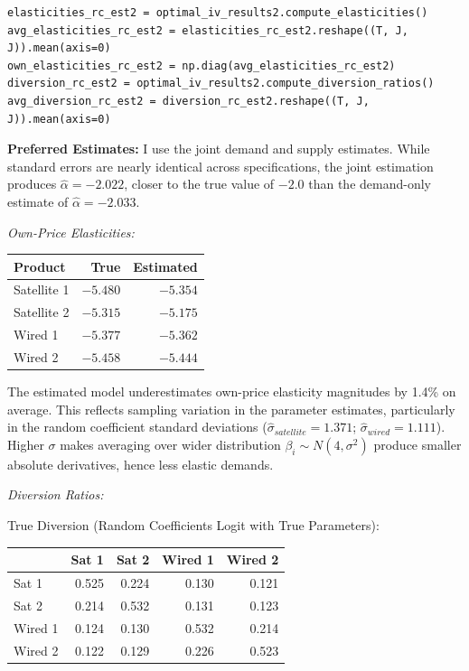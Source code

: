 \documentclass[english,11pt]{article}
\begin{document}
\begin{enumerate}
\begin{verbatim}
elasticities_rc_est2 = optimal_iv_results2.compute_elasticities()
avg_elasticities_rc_est2 = elasticities_rc_est2.reshape((T, J, J)).mean(axis=0)
own_elasticities_rc_est2 = np.diag(avg_elasticities_rc_est2)
diversion_rc_est2 = optimal_iv_results2.compute_diversion_ratios()
avg_diversion_rc_est2 = diversion_rc_est2.reshape((T, J, J)).mean(axis=0)
\end{verbatim}

\textbf{Preferred Estimates:} I use the joint demand and supply estimates. While standard errors are nearly identical across specifications, the joint estimation produces $\hat{\alpha} = -2.022$, closer to the true value of $-2.0$ than the demand-only estimate of $\hat{\alpha} = -2.033$. 

\textit{Own-Price Elasticities:}

\begin{center}
\begin{tabular}{lrr}
\hline
Product & True & Estimated \\
\hline
Satellite 1 & $-5.480$ & $-5.354$ \\
Satellite 2 & $-5.315$ & $-5.175$ \\
Wired 1 & $-5.377$ & $-5.362$ \\
Wired 2 & $-5.458$ & $-5.444$ \\
\hline
\end{tabular}
\end{center}

The estimated model underestimates own-price elasticity magnitudes by 1.4\% on average. This reflects sampling variation in the parameter estimates, particularly in the random coefficient standard deviations ($\hat{\sigma}_{satellite} = 1.371$; $\hat{\sigma}_{wired} = 1.111$). Higher $\sigma$ makes averaging over wider distribution $\beta_i \sim N(4, \sigma^2)$ produce smaller absolute derivatives, hence less elastic demands.


\textit{Diversion Ratios:}

True Diversion (Random Coefficients Logit with True Parameters):
\begin{center}
\begin{tabular}{lrrrr}
\hline
 & Sat 1 & Sat 2 & Wired 1 & Wired 2 \\
\hline
Sat 1 & 0.525 & 0.224 & 0.130 & 0.121 \\
Sat 2 & 0.214 & 0.532 & 0.131 & 0.123 \\
Wired 1 & 0.124 & 0.130 & 0.532 & 0.214 \\
Wired 2 & 0.122 & 0.129 & 0.226 & 0.523 \\
\hline
\end{tabular}
\end{center}


\end{enumerate}
\end{document}
